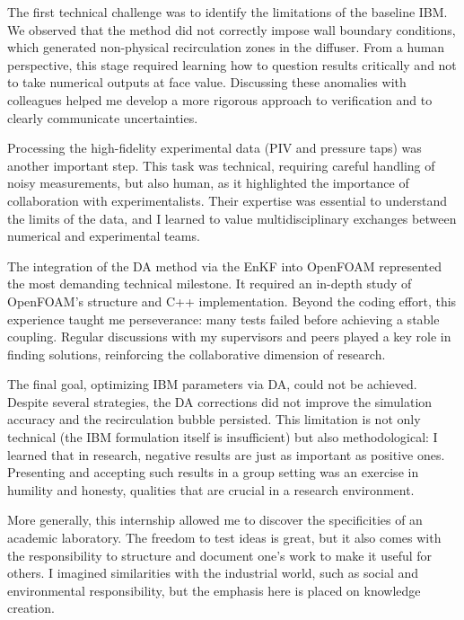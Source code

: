 The first technical challenge was to identify the limitations of the baseline IBM. We observed that the method did not correctly impose wall boundary conditions, which generated non-physical recirculation zones in the diffuser. From a human perspective, this stage required learning how to question results critically and not to take numerical outputs at face value. Discussing these anomalies with colleagues helped me develop a more rigorous approach to verification and to clearly communicate uncertainties.

Processing the high-fidelity experimental data (PIV and pressure taps) was another important step. This task was technical, requiring careful handling of noisy measurements, but also human, as it highlighted the importance of collaboration with experimentalists. Their expertise was essential to understand the limits of the data, and I learned to value multidisciplinary exchanges between numerical and experimental teams.

The integration of the DA method via the EnKF into OpenFOAM represented the most demanding technical milestone. It required an in-depth study of OpenFOAM's structure and C++ implementation. Beyond the coding effort, this experience taught me perseverance: many tests failed before achieving a stable coupling. Regular discussions with my supervisors and peers played a key role in finding solutions, reinforcing the collaborative dimension of research. %

The final goal, optimizing IBM parameters via DA, could not be achieved. Despite several strategies, the DA corrections did not improve the simulation accuracy and the recirculation bubble persisted. This limitation is not only technical (the IBM formulation itself is insufficient) but also methodological: I learned that in research, negative results are just as important as positive ones. Presenting and accepting such results in a group setting was an exercise in humility and honesty, qualities that are crucial in a research environment.

More generally, this internship allowed me to discover the specificities of an academic laboratory. The freedom to test ideas is great, but it also comes with the responsibility to structure and document one's work to make it useful for others. I imagined similarities with the industrial world, such as social and environmental responsibility, but the emphasis here is placed on knowledge creation. %


